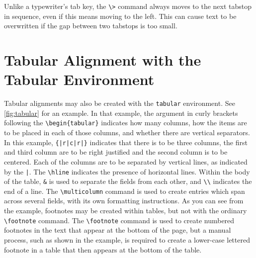 Unlike a typewriter's tab key, the \verb|\>| command always moves to
the next tabstop in sequence, even if this means moving to the left.
This can cause text to be overwritten if the gap between two tabstops
is too small.
 
\section{Tabular Alignment with the Tabular Environment}
Tabular alignments may also be created with the \verb+tabular+
environment.
See \ref{fig:tabular} for an example.
In that example, the argument in curly brackets following the
\verb+\begin{tabular}+ indicates how many columns, how the items are to
be placed in each of those columns, and whether there are vertical
separators. In this example, \verb+{|r|c|r|}+ indicates that there
is to be three columns, the first and third column are to be right
justified and the second column is to be centered.  Each of the columns
are to be separated by vertical lines, as indicated by the \verb+|+.
The \verb+\hline+ indicates the presence of horizontal lines.
Within the body of the table, \verb+&+ is used to separate the fields
from each other, and \verb+\\+ indicates the end of a line.
The \verb+\multicolumn+ command is used to create entries which span
across several fields, with its own formatting instructions.
As you can see from the example, footnotes may be created within
tables, but not with the ordinary \verb+\footnote+ command.
The \verb+\footnote+ command is used to create numbered footnotes in
the text that appear at the bottom of the page, but a manual process,
such as shown in the example, is required to create a lower-case lettered
footnote in a table that then appears at the bottom of the table.
 
